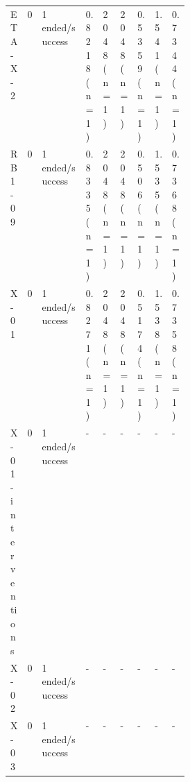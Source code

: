 \documentclass[11pt]{article}
\begin{document}
\begin{table}[H]
\begin{tabular}{llp{0.3\linewidth}llllll}
ETA-X-2 & 0 & 1 ended/success & 0.8218 (n=1) & 2048 (n=1) & 2048 (n=1) & 0.5359 (n=1) & 1.541 (n=1) & 0.7344 (n=1) \\
RB1-09 & 0 & 1 ended/success & 0.8335 (n=1) & 2048 (n=1) & 2048 (n=1) & 0.506 (n=1) & 1.535 (n=1) & 0.7368 (n=1) \\
X-01 & 0 & 1 ended/success & 0.8271 (n=1) & 2048 (n=1) & 2048 (n=1) & 0.5174 (n=1) & 1.538 (n=1) & 0.7358 (n=1) \\
X-01-interventions & 0 & 1 ended/success & - & - & - & - & - & - \\
X-02 & 0 & 1 ended/success & - & - & - & - & - & - \\
X-03 & 0 & 1 ended/success & - & - & - & - & - & - \\
\bottomrule
\end{tabular}
\par{}
\end{table}
\end{document}
